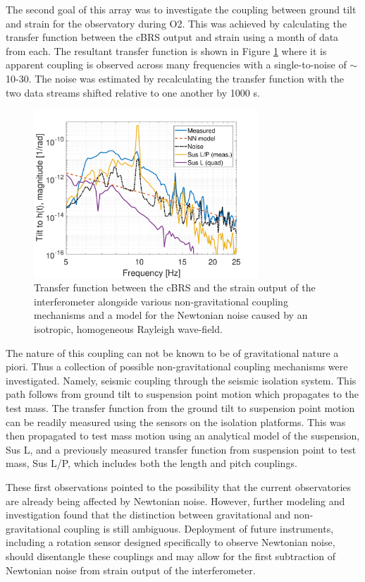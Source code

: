 \documentclass [12pt, proquest]{uwthesis}[2019]
\begin{document}
The second goal of this array was to investigate the coupling between ground tilt and strain for the observatory during O2. This was achieved by calculating the transfer function between the cBRS output and strain using a month of data from each. The resultant transfer function is shown in Figure \ref{NNCoupling} where it is apparent coupling is observed across many frequencies with a single-to-noise of $\sim$10-30. The noise was estimated by recalculating the transfer function with the two data streams shifted relative to one another by 1000 s. 

\begin{figure}[!h]
\begin{center}
\includegraphics[width=0.75\textwidth]{NNCoupling.pdf}
\end{center}
\caption[Transfer function between the cBRS and the strain output of the interferometer]{Transfer function between the cBRS and the strain output of the interferometer alongside various non-gravitational coupling mechanisms and a model for the Newtonian noise caused by an isotropic, homogeneous Rayleigh wave-field.}
\label{NNCoupling}
\end{figure}

The nature of this coupling can not be known to be of gravitational nature a piori. Thus a collection of possible non-gravitational coupling mechanisms were investigated. \cite{NN} Namely, seismic coupling through the seismic isolation system. This path follows from ground tilt to suspension point motion which propagates to the test mass. The transfer function from the ground tilt to suspension point motion can be readily measured using the sensors on the isolation platforms. This was then propagated to test mass motion using an analytical model of the suspension, Sus L, and a previously measured transfer function from suspension point to test mass, Sus L/P, which includes both the length and pitch couplings.

These first observations pointed to the possibility that the current observatories are already being affected by Newtonian noise. However, further modeling and investigation \cite{NN2} found that the distinction between gravitational and non-gravitational coupling is still ambiguous. Deployment of future instruments, including a rotation sensor designed specifically to observe Newtonian noise, should disentangle these couplings and may allow for the first subtraction of Newtonian noise from strain output of the interferometer.

\printendnotes
\nocite{*}   


\end{document}
